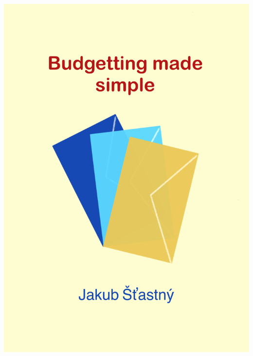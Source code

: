 \documentclass[a5paper,10pt]{book}
\begin{document}
\begin{titlepage}
\includegraphics[width=\pdfpagewidth,height=\pdfpageheight]{"assets/cover"}
\end{titlepage}

\begin{figure}
  \centering
\end{figure}
\end{document}
